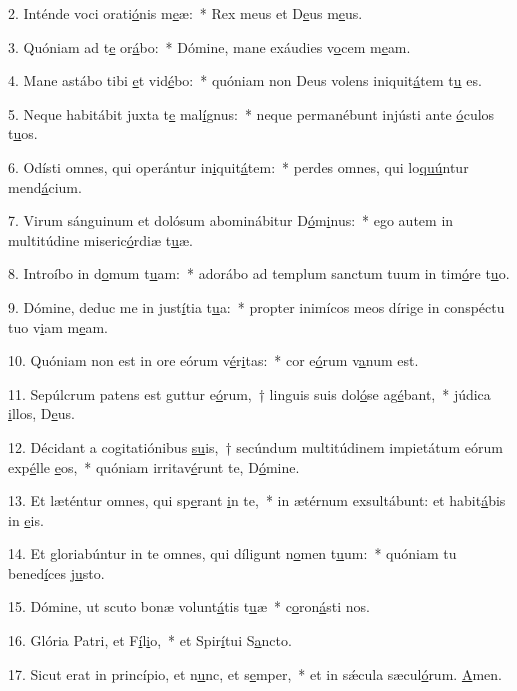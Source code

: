 2. Inténde voci orati\uline{ó}nis m\uline{e}æ:~* Rex meus et D\uline{e}us m\uline{e}us.\par 
3. Quóniam ad t\uline{e} or\uline{á}bo:~* Dómine, mane exáudies v\uline{o}cem m\uline{e}am.\par 
4. Mane astábo tibi \uline{e}t vid\uline{é}bo:~* quóniam non Deus volens iniquit\uline{á}tem t\uline{u} es.\par 
5. Neque habitábit juxta t\uline{e} mal\uline{í}gnus:~* neque permanébunt injústi ante \uline{ó}culos t\uline{u}os.\par 
6. Odísti omnes, qui operántur in\uline{i}quit\uline{á}tem:~* perdes omnes, qui lo\uline{quú}ntur mend\uline{á}cium.\par 
7. Virum sánguinum et dolósum abominábitur D\uline{ó}m\uline{i}nus:~* ego autem in multitúdine miseric\uline{ó}rdiæ t\uline{u}æ.\par 
8. Introíbo in d\uline{o}mum t\uline{u}am:~* adorábo ad templum sanctum tuum in tim\uline{ó}re t\uline{u}o.\par 
9. Dómine, deduc me in just\uline{í}tia t\uline{u}a:~* propter inimícos meos dírige in conspéctu tuo v\uline{i}am m\uline{e}am.\par 
10. Quóniam non est in ore eórum v\uline{é}r\uline{i}tas:~* cor e\uline{ó}rum v\uline{a}num est.\par 
11. Sepúlcrum patens est guttur e\uline{ó}rum,~† linguis suis dol\uline{ó}se ag\uline{é}bant,~* júdica \uline{i}llos, D\uline{e}us.\par 
12. Décidant a cogitatiónibus \uline{su}is,~† secúndum multitúdinem impietátum eórum exp\uline{é}lle \uline{e}os,~* quóniam irritav\uline{é}runt te, D\uline{ó}mine.\par 
13. Et læténtur omnes, qui sp\uline{e}rant \uline{i}n te,~* in ætérnum exsultábunt: et habit\uline{á}bis in \uline{e}is.\par 
14. Et gloriabúntur in te omnes, qui díligunt n\uline{o}men t\uline{u}um:~* quóniam tu bened\uline{í}ces j\uline{u}sto.\par 
15. Dómine, ut scuto bonæ volunt\uline{á}tis t\uline{u}æ~* c\uline{o}ron\uline{á}sti nos.\par 
16. Glória Patri, et F\uline{í}l\uline{i}o,~* et Spir\uline{í}tui S\uline{a}ncto.\par 
17. Sicut erat in princípio, et n\uline{u}nc, et s\uline{e}mper,~* et in sǽcula sæcul\uline{ó}rum. \uline{A}men.\par 
